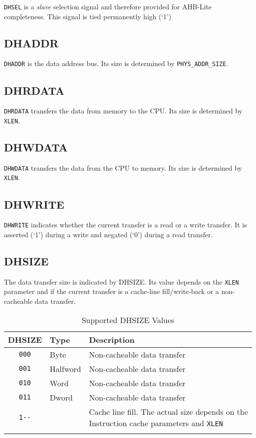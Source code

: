 \texttt{DHSEL} is a \emph{slave} selection signal and therefore provided for AHB-Lite
completeness. This signal is tied permanently high (`1')

\subsection{DHADDR}\label{dhaddr}

\texttt{DHADDR} is the data address bus. Its size is determined by
\texttt{PHYS\_ADDR\_SIZE}.

\subsection{DHRDATA}\label{dhrdata}

\texttt{DHRDATA} transfers the data from memory to the CPU. Its size is
determined by \texttt{XLEN}.

\subsection{DHWDATA}\label{dhwdata}

\texttt{DHWDATA} transfers the data from the CPU to memory. Its size is
determined by \texttt{XLEN}.

\subsection{DHWRITE}\label{dhwrite}

\texttt{DHWRITE} indicates whether the current transfer is a read or a write
transfer. It is asserted (`1') during a write and negated (`0') during a
read transfer.

\subsection{DHSIZE}\label{dhsize}

The data transfer size is indicated by DHSIZE. Its value depends on the
\texttt{XLEN} parameter and if the current transfer is a cache-line
fill/write-back or a non-cacheable data transfer.

\begin{longtable}[]{@{}clp{7.5cm}@{}}
\toprule
DHSIZE & Type & Description\tabularnewline
\midrule
\endhead
\texttt{000}   & Byte     & Non-cacheable data transfer\tabularnewline
\texttt{001}   & Halfword & Non-cacheable data transfer\tabularnewline
\texttt{010}   & Word     & Non-cacheable data transfer\tabularnewline
\texttt{011}   & Dword    & Non-cacheable data transfer\tabularnewline
\texttt{1-\/-} &          & Cache line fill. The actual size depends on the Instruction cache parameters and \texttt{XLEN}\tabularnewline
\bottomrule
\caption{Supported DHSIZE Values}
\label{tab:dhsize-values}
\end{longtable}

